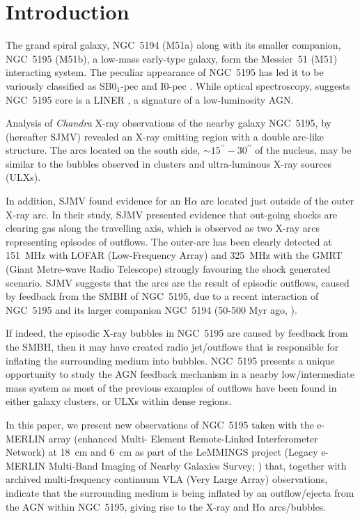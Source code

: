 \documentclass[fleqn,usenatbib]{mnras}
\begin{document}
\section{Introduction}


The grand spiral galaxy, NGC~5194 (M51a) along with its smaller companion, NGC~5195 (M51b), a low-mass 
early-type galaxy, form the Messier~51 (M51) interacting system. The peculiar appearance of NGC~5195 has led it to be variously classified as SB0$_{1}$-pec 
\citep{SandageTammann1981} and I0-pec \citep{RC3}. While optical spectroscopy, suggests NGC~5195 core is 
a LINER \citep{hoetal1997}, a signature of a low-luminosity AGN.  
 
Analysis of \textit{Chandra} X-ray observations of the nearby galaxy NGC~5195, by \cite{SJMV} (hereafter 
SJMV) revealed an X-ray emitting region with a double arc-like structure. The arcs located on the 
south side, $\sim15^{\prime \prime} - 30^{\prime \prime} $ of the nucleus, may be 
similar to the bubbles observed in clusters and ultra-luminous X-ray sources (ULXs).  

In addition, SJMV found evidence for an  H$\alpha$ 
arc located just outside of the outer X-ray arc. In their study, SJMV presented evidence that out-going 
shocks are clearing gas along the travelling axis, which is observed as two X-ray arcs representing 
episodes of outflows. The outer-arc has been clearly detected at 151~MHz with LOFAR (Low-Frequency 
Array) \citep{Mulcahyetal2014} and 325~MHz with the GMRT (Giant Metre-wave Radio Telescope) 
\citep{Mulcahyetal2016} strongly favouring the shock generated scenario. SJMV suggests that the arcs are 
the result of episodic outflows, caused by feedback from the SMBH of NGC~5195, due to a recent 
interaction of NGC~5195 and its larger companion NGC~5194 (50-500 Myr ago, 
\cite{SL2000,Dobbsetal2010,Mentuchetal2012}).
  
If indeed, the episodic X-ray bubbles in NGC~5195 are caused by feedback from the SMBH, then it may have 
created radio jet/outflows that is responsible for inflating the surrounding medium into bubbles. 
NGC~5195 presents a unique opportunity to study the AGN feedback mechanism in a nearby low/intermediate 
mass system as most of the previous examples of outflows have been found in either galaxy clusters, or 
ULXs within dense regions.

In this paper, we present new observations of NGC~5195 taken with the e-MERLIN array (enhanced Multi-
Element Remote-Linked Interferometer Network) at 18~cm and 6~cm as part of the LeMMINGS project (Legacy 
e-MERLIN Multi-Band Imaging of Nearby Galaxies Survey; \citealt{lemmings2014}) that, together with 
archived multi-frequency continuum VLA (Very Large Array) observations, indicate that 
the surrounding medium is being inflated by an outflow/ejecta from the AGN within NGC~5195, giving rise to the X-ray and H$\alpha$ arcs/bubbles.
\end{document}
